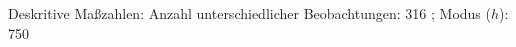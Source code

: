 				\label{tableValues:bdem12a_g2}
				\vspace*{-\baselineskip}
                    \begin{noten}
                	    \note{} Deskritive Maßzahlen:
                	    Anzahl unterschiedlicher Beobachtungen: 316%
                	    ; 
                	      Modus ($h$): 750
                     \end{noten}


